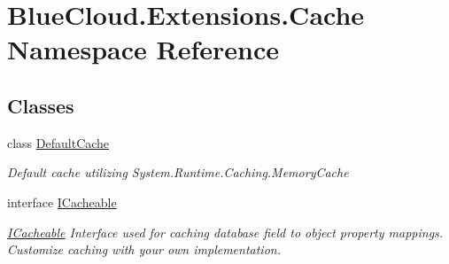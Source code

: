 \hypertarget{namespace_blue_cloud_1_1_extensions_1_1_cache}{}\section{Blue\+Cloud.\+Extensions.\+Cache Namespace Reference}
\label{namespace_blue_cloud_1_1_extensions_1_1_cache}
\subsection*{Classes}
\begin{DoxyCompactItemize}
\item 
class \mbox{\hyperlink{class_blue_cloud_1_1_extensions_1_1_cache_1_1_default_cache}{Default\+Cache}}
\begin{DoxyCompactList}\small\item\em Default cache utilizing System.\+Runtime.\+Caching.\+Memory\+Cache \end{DoxyCompactList}\item 
interface \mbox{\hyperlink{interface_blue_cloud_1_1_extensions_1_1_cache_1_1_i_cacheable}{I\+Cacheable}}
\begin{DoxyCompactList}\small\item\em \mbox{\hyperlink{interface_blue_cloud_1_1_extensions_1_1_cache_1_1_i_cacheable}{I\+Cacheable}} Interface used for caching database field to object property mappings. Customize caching with your own implementation. \end{DoxyCompactList}\end{DoxyCompactItemize}
